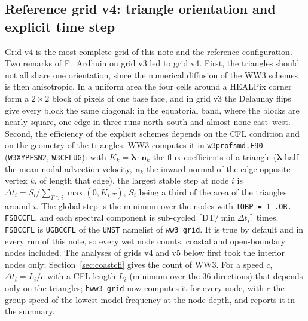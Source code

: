\documentclass[11pt,a4paper]{article}
\begin{document}
\subsection{Reference grid v4: triangle orientation and explicit time step}\label{sec:v4}
Grid v4 is the most complete grid of this note and the reference
configuration. Two remarks of F.~Ardhuin on grid v3 led to grid v4. First, the triangles
should not all share one orientation, since the numerical diffusion of the
WW3 schemes is then anisotropic. In a uniform area the four cells around a
HEALPix corner form a $2\times2$ block of pixels of one base face, and in
grid v3 the Delaunay flips give every block the same diagonal: in the
equatorial band, where the blocks are nearly square, one edge in three
runs north--south and almost none east--west. Second, the efficiency of
the explicit schemes depends on the CFL condition and on the geometry of
the triangles. WW3 computes it in \texttt{w3profsmd.F90}
(\texttt{W3XYPFSN2}, \texttt{W3CFLUG}): with $K_k=\boldsymbol\lambda\cdot\mathbf
n_k$ the flux coefficients of a triangle ($\boldsymbol\lambda$ half the mean
nodal advection velocity, $\mathbf n_k$ the inward normal of the edge
opposite vertex $k$, of length that edge), the largest stable step at node
$i$ is $\Delta t_i = S_i/\sum_{T\ni i}\max(0,K_{i,T})$, $S_i$ being a third of
the area of the triangles around $i$. The global step is the minimum over
the nodes with \texttt{IOBP = 1 .OR. FSBCCFL}, and each spectral component
is sub-cycled $\lceil \mathrm{DT}/\min\Delta t_i\rceil$ times.
\texttt{FSBCCFL} is \texttt{UGBCCFL} of the \texttt{UNST} namelist of
\texttt{ww3\_grid}. It is true by default and in every run of this note,
so every wet node counts, coastal and open-boundary nodes included. The
analyses of grids v4 and v5 below first took the interior nodes only;
Section~\ref{sec:coastcfl} gives the count of WW3. For a speed $c$,
$\Delta t_i=L_i/c$ with a CFL length $L_i$ (minimum over the 36 directions)
that depends only on the triangles; \texttt{hww3-grid} now computes it for
every node, with $c$ the group speed of the lowest model frequency at the
node depth, and reports it in the summary.
\end{document}
